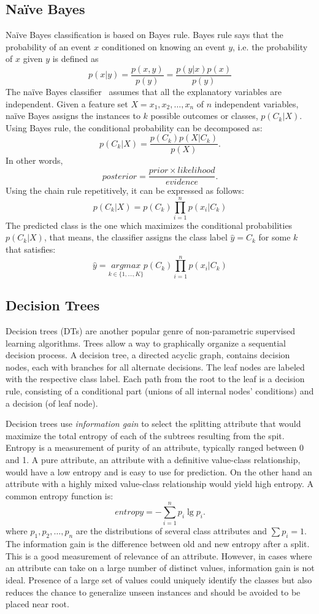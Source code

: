 \subsection*{Na\"ive Bayes}
Na\"ive Bayes classification is based on Bayes rule. Bayes rule says that the probability of an event $x$ conditioned on knowing an event $y$, i.e. the probability of $x$ given $y$ is defined as
\[
p(x|y) = \frac{p(x,y)}{p(y)} = \frac{p(y|x) p(x)}{p(y)}
\]
The na\"ive Bayes classifier~\cite{langley92:nb} assumes that all the explanatory variables are independent. Given a feature set $X = x_1, x_2, \dots, x_n$ of $n$ independent variables, na\"ive Bayes assigns the instances to $k$ possible outcomes or classes, $p(C_k | X)$. Using Bayes rule, the conditional probability can be decomposed as:
\[
p(C_k |X) = \frac{p(C_k) p(X|C_k)}{p(X)}.
\]
In other words,
\[
posterior = \frac{prior \times likelihood}{evidence}.
\]
Using the chain rule repetitively, it can be expressed as follows:
\[
p(C_k |X) = p(C_k) \prod_{i=1}^n p(x_i | C_k)
\]
The predicted class is the one which maximizes the conditional probabilities $p(C_k|X)$, that means, the classifier assigns the class label $\hat{y} = C_k$ for some $k$ that satisfies:
\[
\hat{y} = \underset{k \in \{1, \dots, K\}}{argmax}  p(C_k) \prod_{i=1}^n p(x_i | C_k)
\]

\subsection*{Decision Trees}
Decision trees (DTs) are another popular genre of non-parametric supervised learning algorithms. Trees allow a way to graphically organize a sequential decision process. A decision tree, a directed acyclic graph, contains decision nodes, each with branches for all alternate decisions. The leaf nodes are labeled with the respective class label. Each path from the root to the leaf is a decision rule, consisting of a conditional part (unions of all internal nodes' conditions) and a decision (of leaf node).

Decision trees use {\it information gain} to select the splitting attribute that would maximize the total entropy of each of the subtrees resulting from the spit. Entropy is a measurement of purity of an attribute, typically ranged between 0 and 1. A pure attribute, an attribute with a definitive value-class relationship, would have a low entropy and is easy to use for prediction. On the other hand an attribute with a highly mixed value-class relationship would yield high entropy. A common entropy function is:
\[
entropy = - \sum_{i=1}^n p_i \lg p_i.
\]
where $p_1, p_2, \dots, p_n$ are the distributions of several class attributes and $\sum p_i = 1$. The information gain is the difference between old and new entropy after a split. This is a good measurement of relevance of an attribute. However, in cases where an attribute can take on a large number of distinct values, information gain is not ideal. Presence of a large set of values could uniquely identify the classes but also reduces the chance to generalize unseen instances and should be avoided to be placed near root.

